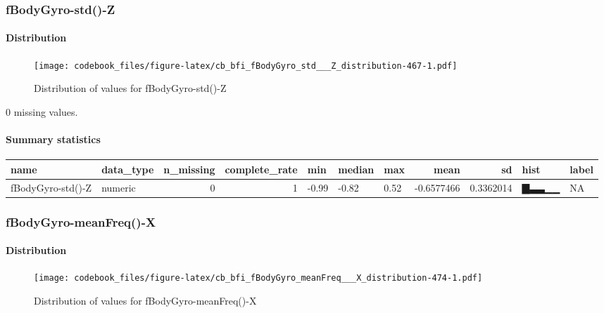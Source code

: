 \documentclass[
]{article}
\begin{document}
\hypertarget{fBodyGyro_std___Z}{%
\subsubsection{fBodyGyro-std()-Z}\label{fBodyGyro_std___Z}}

\hypertarget{fBodyGyro_std___Z_distribution}{%
\paragraph{Distribution}\label{fBodyGyro_std___Z_distribution}}

\begin{figure}
\centering
\texttt{[image: codebook\_files/figure-latex/cb\_bfi\_fBodyGyro\_std\_\_\_Z\_distribution-467-1.pdf]}
\caption{Distribution of values for fBodyGyro-std()-Z}
\end{figure}

0 missing values.

\hypertarget{fBodyGyro_std___Z_summary}{%
\paragraph{Summary statistics}\label{fBodyGyro_std___Z_summary}}

\begin{longtable}[]{@{}llrrlllrrll@{}}
\toprule
name & data\_type & n\_missing & complete\_rate & min & median & max &
mean & sd & hist & label \\
\midrule
\endhead
fBodyGyro-std()-Z & numeric & 0 & 1 & -0.99 & -0.82 & 0.52 & -0.6577466
& 0.3362014 & ▇▃▃▁▁ & NA \\
\bottomrule
\end{longtable}

\hypertarget{fBodyGyro_meanFreq___X}{%
\subsubsection{fBodyGyro-meanFreq()-X}\label{fBodyGyro_meanFreq___X}}

\hypertarget{fBodyGyro_meanFreq___X_distribution}{%
\paragraph{Distribution}\label{fBodyGyro_meanFreq___X_distribution}}

\begin{figure}
\centering
\texttt{[image: codebook\_files/figure-latex/cb\_bfi\_fBodyGyro\_meanFreq\_\_\_X\_distribution-474-1.pdf]}
\caption{Distribution of values for fBodyGyro-meanFreq()-X}
\end{figure}
\end{document}
